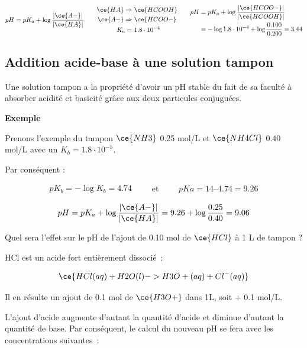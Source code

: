 \documentclass[
  11pt,
  a4paper,
  openany]{book}
\begin{document}
\begin{Answer}
\[
\begin{split}
  pH = pK_a + \log \frac{|\ce{A-}|}{|\ce{HA}|}
\end{split}
\qquad
\begin{split}
  \ce{HA} \Rightarrow &\ \ce{HCOOH} \\
  \ce{A-} \Rightarrow &\ \ce{HCOO-} \\
  K_a = &\ 1.8 \cdot 10^{-4}
\end{split}
\qquad
\begin{split}
  pH &= pK_a + \log \frac{|\ce{HCOO-}|}{|\ce{HCOOH}|} \\
  &= - \log 1.8 \cdot 10^{-4} + \log \frac{0.100}{0.200} = 3.44 \\
\end{split}
\]

\end{Answer}

\subsection{Addition acide-base à une solution tampon}\label{addition-acide-base-uxe0-une-solution-tampon}

Une solution tampon a la propriété d'avoir un pH stable du fait de sa faculté à absorber acidité et basicité grâce aux deux particules conjuguées.

\textbf{Exemple}

Prenons l'exemple du tampon \(\ce{NH3}\) 0.25 mol/L et \(\ce{NH4Cl}\) 0.40 mol/L avec un \(K_b = 1.8 \cdot 10^{-5}\).

Par conséquent :

\[
\begin{split}
pK_b = - \log K_b = 4.74
\end{split}
\qquad\text{et}\qquad
\begin{split}
pKa = 14 – 4.74 = 9.26
\end{split}
\]

\[
pH = pK_a + \log \frac{|\ce{A-}|}{|\ce{HA}|} = 9.26 + \log \frac{0.25}{0.40} = 9.06
\]

Quel sera l'effet sur le pH de l'ajout de 0.10 mol de \(\ce{HCl}\) à 1 L de tampon ?

HCl est un acide fort entièrement dissocié~:

\[
\ce{HCl(aq) + H2O(l) -> H3O+(aq) + Cl^{-}(aq)}
\]

Il en résulte un ajout de 0.1 mol de \(\ce{H3O+}\) dans 1L, soit + 0.1 mol/L.

L'ajout d'acide augmente d'autant la quantité d'acide et diminue d'autant la quantité de base. Par conséquent, le calcul du nouveau pH se fera avec les concentrations suivantes~:
\end{document}

